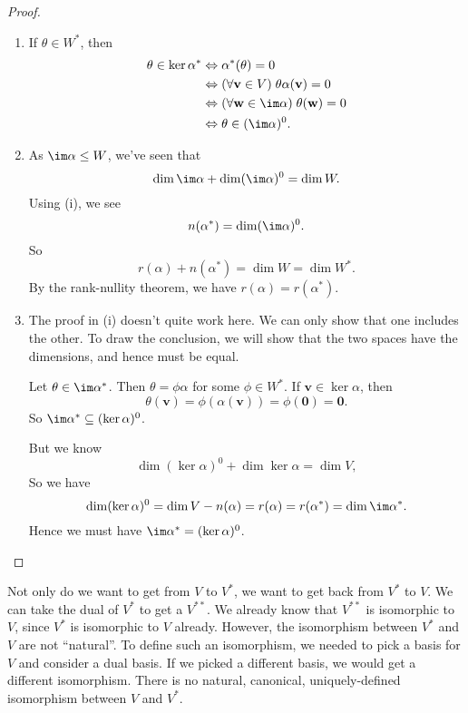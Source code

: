 \documentclass[a4paper]{article}
\begin{document}
\begin{proof}\leavevmode
  \begin{enumerate}
    \item If $\theta \in W^*$, then
      \begin{align*}
        \theta \in \ker \alpha^* &\Leftrightarrow \alpha^*(\theta) = 0 \\
        &\Leftrightarrow (\forall \mathbf{v}\in V)\; \theta \alpha(\mathbf{v}) = 0 \\
        &\Leftrightarrow (\forall \mathbf{w}\in \im \alpha)\; \theta(\mathbf{w}) = 0\\
        &\Leftrightarrow \theta \in (\im \alpha)^0.
      \end{align*}
    \item As $\im \alpha \leq W$, we've seen that
      \[
        \dim \im \alpha + \dim (\im \alpha)^0 = \dim W.
      \]
      Using (i), we see
      \[
        n(\alpha^*) = \dim (\im \alpha)^0.
      \]
      So
      \[
        r(\alpha) + n(\alpha^*) = \dim W = \dim W^*.
      \]
      By the rank-nullity theorem, we have $r(\alpha) = r(\alpha^*)$.
    \item The proof in (i) doesn't quite work here. We can only show that one includes the other. To draw the conclusion, we will show that the two spaces have the dimensions, and hence must be equal.

      Let $\theta \in \im \alpha^*$. Then $\theta = \phi \alpha$ for some $\phi \in W^*$. If $\mathbf{v}\in \ker\alpha$, then
      \[
        \theta(\mathbf{v}) = \phi(\alpha(\mathbf{v})) = \phi(\mathbf{0}) = \mathbf{0}.
      \]
      So $\im \alpha^* \subseteq (\ker\alpha)^0$.

      But we know
      \[
        \dim (\ker \alpha)^0 + \dim \ker \alpha = \dim V,
      \]
      So we have
      \[
        \dim (\ker \alpha)^0 = \dim V - n(\alpha) = r(\alpha) = r(\alpha^*) = \dim \im \alpha^*.
      \]
      Hence we must have $\im \alpha^* = (\ker \alpha)^0$.
  \end{enumerate}
\end{proof}

Not only do we want to get from $V$ to $V^*$, we want to get back from $V^*$ to $V$. We can take the dual of $V^*$ to get a $V^{**}$. We already know that $V^{**}$ is isomorphic to $V$, since $V^*$ is isomorphic to $V$ already. However, the isomorphism between $V^*$ and $V$ are not ``natural''. To define such an isomorphism, we needed to pick a basis for $V$ and consider a dual basis. If we picked a different basis, we would get a different isomorphism. There is no natural, canonical, uniquely-defined isomorphism between $V$ and $V^*$.
\end{document}
